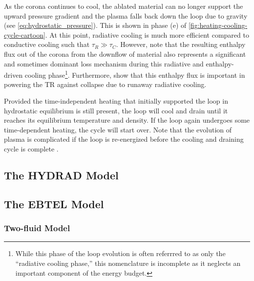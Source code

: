 As the corona continues to cool, the ablated material can no longer support the upward pressure gradient and the plasma falls back down the loop due to gravity (see \autoref{eq:hydrostatic_pressure}). This is shown in phase (e) of \autoref{fig:heating-cooling-cycle-cartoon}. At this point, radiative cooling is much more efficient compared to conductive cooling such that $\tau_R\gg\tau_C$. However, \citep{bradshaw_cooling_2010} note that the resulting enthalpy flux out of the corona from the downflow of material also represents a significant and sometimes dominant loss mechanism during this radiative and enthalpy-driven cooling phase\footnote{While this phase of the loop evolution is often referrred to as only the ``radiative cooling phase,'' this nomenclature is incomplete as it neglects an important component of the energy budget.}. Furthermore, \citep{bradshaw_reinterpretation_2008,bradshaw_cooling_2010} show that this enthalpy flux is important in powering the TR against collapse due to runaway radiative cooling.

Provided the time-independent heating that initially supported the loop in hydrostatic equilibrium is still present, the loop will cool and drain until it reaches its equilibrium temperature and density. If the loop again undergoes some time-dependent heating, the cycle will start over. Note that the evolution of plasma is complicated if the loop is re-energized before the cooling and draining cycle is complete \citep[e.g.][or \autoref{sec:modeling-observables:heating}]{cargill_active_2014,barnes_inference_2016-1}.

\subsection{The HYDRAD Model}\label{sec:hydrad}


\subsection{The EBTEL Model}\label{sec:ebtel}


\subsubsection{Two-fluid Model}\label{sec:ebtel-two-fluid}

